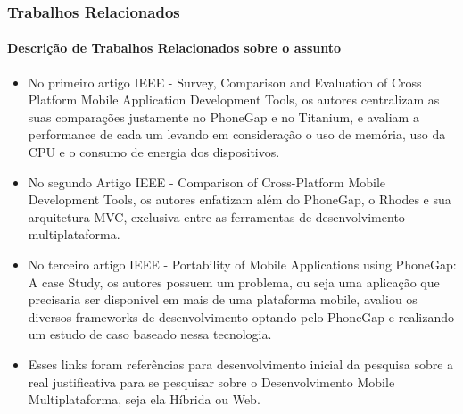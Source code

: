 \documentclass[10pt]{beamer}
\begin{document}
\begin{frame}
	\frametitle{Trabalhos Relacionados}
	\framesubtitle{Descrição de Trabalhos Relacionados sobre o assunto}
	\begin{itemize}
			\item No primeiro artigo IEEE - Survey, Comparison and Evaluation of Cross Platform Mobile Application Development Tools, os autores centralizam as suas comparações justamente no PhoneGap e no Titanium, e avaliam a performance de cada um levando em consideração o uso de memória, uso da CPU e o consumo de energia dos dispositivos.
			\item No segundo Artigo IEEE - Comparison of Cross-Platform Mobile Development Tools, os autores enfatizam além do PhoneGap, o Rhodes e sua arquitetura MVC, exclusiva entre as ferramentas de desenvolvimento multiplataforma.
			\item No terceiro artigo IEEE - Portability of Mobile Applications using PhoneGap: A case Study, os autores possuem um problema, ou seja uma aplicação que precisaria ser disponivel em mais de uma plataforma mobile, avaliou os diversos frameworks de desenvolvimento optando pelo PhoneGap e realizando um estudo de caso baseado nessa tecnologia.
			\item Esses links foram referências para desenvolvimento inicial da pesquisa sobre a real justificativa para se pesquisar sobre o Desenvolvimento Mobile Multiplataforma, seja ela Híbrida ou Web.
	\end{itemize}	
\end{frame}
\end{document}
